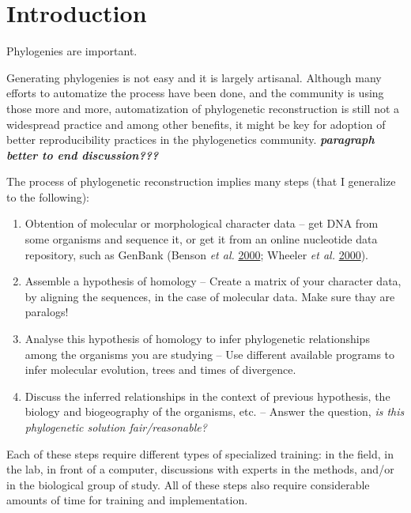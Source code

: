 \documentclass[]{article}
\providecommand{\tightlist}{%
  \setlength{\itemsep}{0pt}\setlength{\parskip}{0pt}}
\begin{document}
\hypertarget{introduction}{%
\section{Introduction}\label{introduction}}

Phylogenies are important.

Generating phylogenies is not easy and it is largely artisanal. Although many efforts to automatize the process have been done, and the community is using those more and more, automatization of phylogenetic reconstruction is still not a widespread practice and among other benefits, it might be key for adoption of better reproducibility practices in the phylogenetics community. \textbf{\emph{paragraph better to end discussion??? }}

The process of phylogenetic reconstruction implies many steps (that I generalize to the following):

\begin{enumerate}
\def\labelenumi{\arabic{enumi}.}
\tightlist
\item
  Obtention of molecular or morphological character data -- get DNA from some organisms
  and sequence it, or get it from an online nucleotide data repository, such as GenBank (Benson \emph{et al.} \protect\hyperlink{ref-benson2000genbank}{2000}; Wheeler \emph{et al.} \protect\hyperlink{ref-wheeler2000database}{2000}).
\item
  Assemble a hypothesis of homology -- Create a matrix of your character data, by
  aligning the sequences, in the case of molecular data. Make sure thay are paralogs!
\item
  Analyse this hypothesis of homology to infer phylogenetic relationships among
  the organisms you are studying -- Use different available programs to infer molecular
  evolution, trees and times of divergence.
\item
  Discuss the inferred relationships in the context of previous hypothesis, the
  biology and biogeography of the organisms, etc. -- Answer the question, \emph{is this phylogenetic solution fair/reasonable?}
\end{enumerate}

Each of these steps require different types of specialized training: in the field,
in the lab, in front of a computer, discussions with experts in the methods, and/or in the biological group of study.
All of these steps also require considerable amounts of time for training and implementation.
\end{document}
